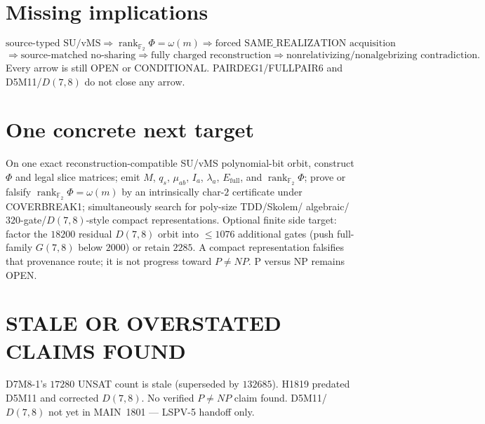 \documentclass[11pt]{article}
\begin{document}
\section*{Missing implications}
\[
\text{source-typed SU/vMS}
\Longrightarrow
\operatorname{rank}_{\mathbb F_2}\Phi=\omega(m)
\Longrightarrow
\text{forced SAME\_REALIZATION acquisition}
\]
\[
\Longrightarrow
\text{source-matched no-sharing}
\Longrightarrow
\text{fully charged reconstruction}
\Longrightarrow
\text{nonrelativizing/nonalgebrizing contradiction}.
\]
Every arrow is still OPEN or CONDITIONAL. PAIRDEG1/FULLPAIR6 and D5M11/$D(7,8)$
do not close any arrow.

\section*{One concrete next target}
On one exact reconstruction-compatible SU/vMS polynomial-bit orbit, construct
$\Phi$ and legal slice matrices; emit $M$, $q_s$, $\mu_{ab}$, $I_a$, $\lambda_a$,
$E_{\mathrm{full}}$, and $\operatorname{rank}_{\mathbb F_2}\Phi$; prove or falsify
$\operatorname{rank}_{\mathbb F_2}\Phi=\omega(m)$ by an intrinsically char-$2$
certificate under COVERBREAK1; simultaneously search for poly-size TDD/Skolem/
algebraic/$320$-gate/$D(7,8)$-style compact representations. Optional finite side
target: factor the $18200$ residual $D(7,8)$ orbit into $\le 1076$ additional gates
(push full-family $G(7,8)$ below $2000$) or retain $2285$. A compact representation
falsifies that provenance route; it is not progress toward $P\neq NP$.
P versus NP remains OPEN.

\section*{STALE OR OVERSTATED CLAIMS FOUND}
D7M8-1's $17280$ UNSAT count is stale (superseded by $132685$). H1819 predated
D5M11 and corrected $D(7,8)$. No verified $P\neq NP$ claim found. D5M11/$D(7,8)$
not yet in MAIN~1801 --- LSPV-5 handoff only.

\end{document}
